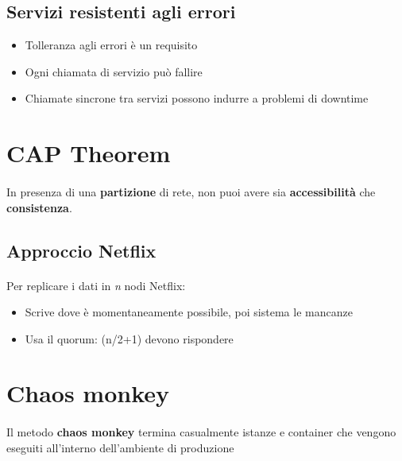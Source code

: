 \documentclass[a4paper, 12pt]{report}
\begin{document}
          \subsection{Servizi resistenti agli errori}
          \begin{itemize}
            \item Tolleranza agli errori è un requisito
            \item Ogni chiamata di servizio può fallire 
            \item Chiamate sincrone tra servizi possono indurre a problemi di downtime
          \end{itemize}
        \section{CAP Theorem}
        \paragraph{}In presenza di una \textbf{partizione} di rete, non puoi avere sia \textbf{accessibilità} che \textbf{consistenza}.
        \subsection{Approccio Netflix}
        \paragraph{}Per replicare i dati in \textit{n} nodi Netflix:
        \begin{itemize}
          \item Scrive dove è momentaneamente possibile, poi sistema le mancanze
          \item Usa il quorum: (n/2+1) devono rispondere
        \end{itemize}
        \section{Chaos monkey}
        \paragraph{}Il metodo \textbf{chaos monkey} termina casualmente istanze e container che vengono eseguiti all'interno dell'ambiente di produzione
        
\end{document}
